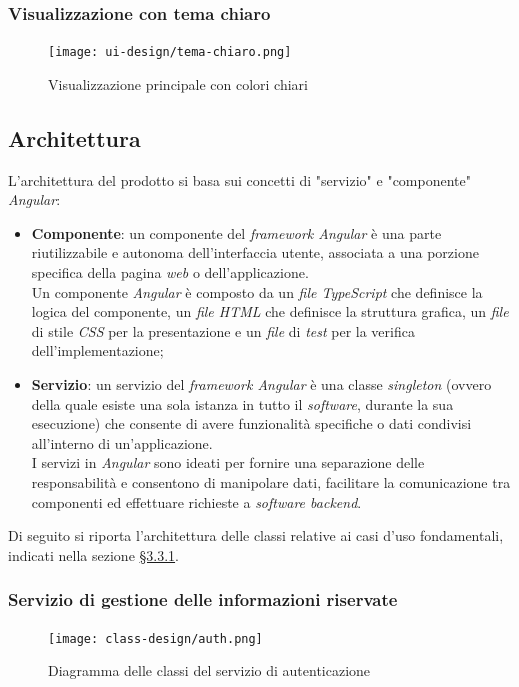 \subsubsection*{Visualizzazione con tema chiaro}

\begin{figure}[H]
    \centering
    \texttt{[image: ui-design/tema-chiaro.png]}
    \caption{Visualizzazione principale con colori chiari}
\end{figure}

\subsection{Architettura}
\label{subsec:architettura}

L'architettura del prodotto si basa sui concetti di "servizio" e "componente" \textit{Angular}:
\begin{itemize}
    \item \textbf{Componente}: un componente del \textit{framework Angular} è una parte riutilizzabile e autonoma dell'interfaccia utente, associata a una porzione specifica della pagina \textit{web} o dell'applicazione. \\
            Un componente \textit{Angular} è composto da un \textit{file TypeScript} che definisce la logica del componente, un \textit{file HTML} che definisce la struttura grafica, un \textit{file} di stile \textit{CSS} per la presentazione e un \textit{file} di \textit{test} per la verifica dell'implementazione;
    \item \textbf{Servizio}: un servizio del \textit{framework Angular} è una classe \textit{singleton} (ovvero della quale esiste una sola istanza in tutto il \textit{software}, durante la sua esecuzione) che consente di avere funzionalità specifiche o dati condivisi all'interno di un'applicazione. \\
            I servizi in \textit{Angular} sono ideati per fornire una separazione delle responsabilità e consentono di manipolare dati, facilitare la comunicazione tra componenti ed effettuare richieste a \textit{software backend}.
\end{itemize}
Di seguito si riporta l'architettura delle classi relative ai casi d'uso fondamentali, indicati nella sezione \hyperref[subsubsec:casi-d'uso]{§3.3.1}.

\subsubsection*{Servizio di gestione delle informazioni riservate}
\begin{figure}[H]
    \centering
    \texttt{[image: class-design/auth.png]}
    \caption{Diagramma delle classi del servizio di autenticazione}
\end{figure}

